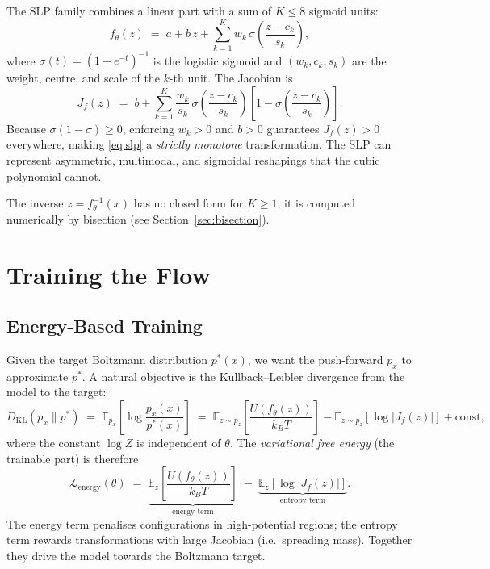 \documentclass[11pt,a4paper]{article}
\newcommand{\E}{\mathbb{E}}
\newcommand{\pz}{p_z}
\newcommand{\px}{p_x}
\newcommand{\ft}{f_{\!\theta}}
\newcommand{\Jf}{J_{\!f}}
\newcommand{\kT}{k_{\!B}T}
\newcommand{\param}{\theta}
\newcommand{\sigmoid}{\sigma}
\begin{document}
The SLP family combines a linear part with a sum of $K \le 8$ sigmoid
units:
\begin{equation}
  \ft(z) \;=\; a + b\,z + \sum_{k=1}^{K} w_k\,\sigmoid\!\left(\frac{z-c_k}{s_k}\right),
  \label{eq:slp}
\end{equation}
where $\sigmoid(t) = (1+e^{-t})^{-1}$ is the logistic sigmoid and
$(w_k, c_k, s_k)$ are the weight, centre, and scale of the $k$-th unit.
The Jacobian is
\begin{equation}
  \Jf(z) \;=\; b + \sum_{k=1}^{K} \frac{w_k}{s_k}\,
                \sigmoid\!\left(\frac{z-c_k}{s_k}\right)
                \left[1 - \sigmoid\!\left(\frac{z-c_k}{s_k}\right)\right].
\end{equation}
Because $\sigmoid(1-\sigmoid) \ge 0$, enforcing $w_k > 0$ and $b > 0$
guarantees $\Jf(z) > 0$ everywhere, making \eqref{eq:slp} a
\emph{strictly monotone} transformation.  The SLP can represent
asymmetric, multimodal, and sigmoidal reshapings that the cubic polynomial
cannot.

The inverse $z = \ft^{-1}(x)$ has no closed form for $K \ge 1$; it is
computed numerically by bisection (see Section~\ref{sec:bisection}).

\section{Training the Flow}

\subsection{Energy-Based Training}
\label{sec:energy}

Given the target Boltzmann distribution $p^*(x)$, we want the push-forward
$\px$ to approximate $p^*$.  A natural objective is the
Kullback--Leibler divergence from the model to the target:
\begin{equation}
  D_{\mathrm{KL}}(\px \| p^*) \;=\;
  \E_{\px}\!\left[\log\frac{\px(x)}{p^*(x)}\right]
  \;=\;
  \E_{z\sim\pz}\!\left[\frac{U(\ft(z))}{\kT}\right]
  - \E_{z\sim\pz}\!\left[\log|\Jf(z)|\right]
  + \text{const},
\end{equation}
where the constant $\log Z$ is independent of $\param$.  The \emph{variational
free energy} (the trainable part) is therefore
\begin{equation}
  \boxed{
  \mathcal{L}_{\text{energy}}(\param) \;=\;
  \underbrace{\E_z\!\left[\frac{U(\ft(z))}{\kT}\right]}_{\text{energy term}}
  \;-\;
  \underbrace{\E_z\!\left[\log|\Jf(z)|\right]}_{\text{entropy term}}.
  }
  \label{eq:energy_loss}
\end{equation}
The energy term penalises configurations in high-potential regions; the
entropy term rewards transformations with large Jacobian (i.e.\ spreading
mass).  Together they drive the model towards the Boltzmann target.
\end{document}
